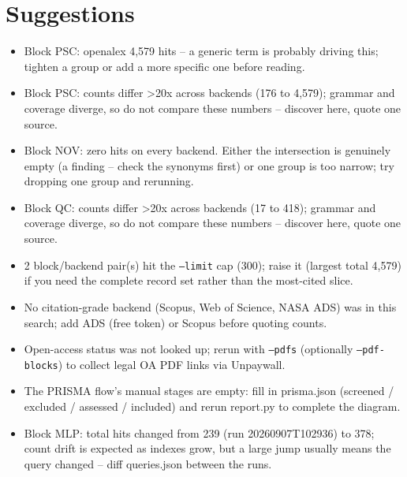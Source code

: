 \documentclass[10pt,a4paper]{article}
\begin{document}
\section*{Suggestions}
\begin{itemize}\item Block PSC: openalex 4,579 hits -- a generic term is probably driving this; tighten a group or add a more specific one before reading.\item Block PSC: counts differ >20x across backends (176 to 4,579); grammar and coverage diverge, so do not compare these numbers -- discover here, quote one source.\item Block NOV: zero hits on every backend. Either the intersection is genuinely empty (a finding -- check the synonyms first) or one group is too narrow; try dropping one group and rerunning.\item Block QC: counts differ >20x across backends (17 to 418); grammar and coverage diverge, so do not compare these numbers -- discover here, quote one source.\item 2 block/backend pair(s) hit the \texttt{--limit} cap (300); raise it (largest total 4,579) if you need the complete record set rather than the most-cited slice.\item No citation-grade backend (Scopus, Web of Science, NASA ADS) was in this search; add ADS (free token) or Scopus before quoting counts.\item Open-access status was not looked up; rerun with \texttt{--pdfs} (optionally \texttt{--pdf-blocks}) to collect legal OA PDF links via Unpaywall.\item The PRISMA flow's manual stages are empty: fill in prisma.json (screened / excluded / assessed / included) and rerun report.py to complete the diagram.\item Block MLP: total hits changed from 239 (run 20260907T102936) to 378; count drift is expected as indexes grow, but a large jump usually means the query changed -- diff queries.json between the runs.\end{itemize}
\end{document}

